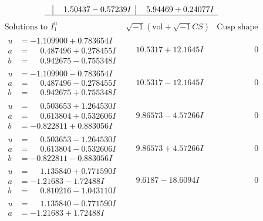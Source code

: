 \documentclass[1p]{elsarticle_modified}
\theoremstyle{definition}
\newcommand{\I}{\sqrt{-1}}
\begin{document}
$$\begin{array}{c|c|c}
 & \phantom{-}1.50437 - 0.57239 I & \phantom{-}5.94469 + 0.24077 I\\
 \hline 
 \end{array}$$\newpage$$\begin{array}{c|c|c}  
\text{Solutions to }I^u_{1}& \I (\text{vol} + \sqrt{-1}CS) & \text{Cusp shape}\\
 \hline 
\begin{aligned}
u &= -1.109900 + 0.783654 I \\
a &= \phantom{-}0.487496 + 0.278455 I \\
b &= \phantom{-}0.942675 - 0.755348 I\end{aligned}
 & \phantom{-}10.5317 + 12.1645 I & \phantom{-0.000000 } 0 \\ \hline\begin{aligned}
u &= -1.109900 - 0.783654 I \\
a &= \phantom{-}0.487496 - 0.278455 I \\
b &= \phantom{-}0.942675 + 0.755348 I\end{aligned}
 & \phantom{-}10.5317 - 12.1645 I & \phantom{-0.000000 } 0 \\ \hline\begin{aligned}
u &= \phantom{-}0.503653 + 1.264530 I \\
a &= \phantom{-}0.613804 + 0.532606 I \\
b &= -0.822811 + 0.883056 I\end{aligned}
 & \phantom{-}9.86573 - 4.57266 I & \phantom{-0.000000 } 0 \\ \hline\begin{aligned}
u &= \phantom{-}0.503653 - 1.264530 I \\
a &= \phantom{-}0.613804 - 0.532606 I \\
b &= -0.822811 - 0.883056 I\end{aligned}
 & \phantom{-}9.86573 + 4.57266 I & \phantom{-0.000000 } 0 \\ \hline\begin{aligned}
u &= \phantom{-}1.135840 + 0.771590 I \\
a &= -1.21683 - 1.72488 I \\
b &= \phantom{-}0.810216 - 1.043110 I\end{aligned}
 & \phantom{-}9.6187 - 18.6094 I & \phantom{-0.000000 } 0 \\ \hline\begin{aligned}
u &= \phantom{-}1.135840 - 0.771590 I \\
a &= -1.21683 + 1.72488 I \\

\end{aligned}
\end{array}$$
\end{document}
